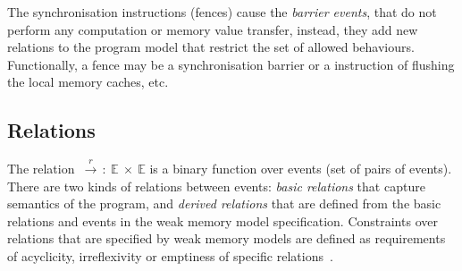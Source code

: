 The synchronisation instructions (fences) cause the \textit{barrier events}, that do not perform any computation or memory value transfer, instead, they add new relations to the program model that restrict the set of allowed behaviours.
Functionally, a fence may be a synchronisation barrier or a instruction of flushing the local memory caches, etc.


\subsection{Relations}
\label{ch:wmm:model:relations}


The relation~$\xrightarrow{r}\,:~\mathbb{E}~\times~\mathbb{E}$ is a binary function over events (set of pairs of events). There are two kinds of relations between events: \textit{basic relations} %
that capture semantics of the program, and \textit{derived relations} that are defined from the basic relations and events in the weak memory model specification. Constraints over relations that are specified by weak memory models are defined as requirements of acyclicity, irreflexivity or emptiness of specific relations~\cite{alglave2016syntax}.

